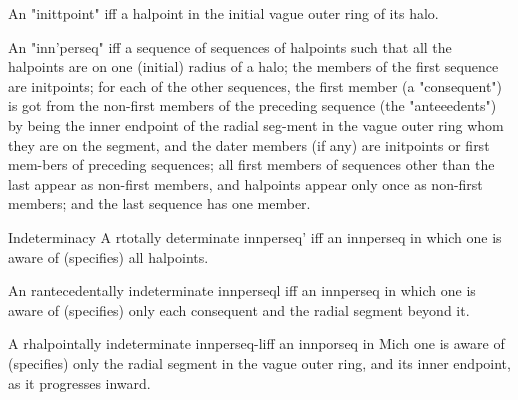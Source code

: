 An "inittpoint" iff a halpoint in the initial vague outer ring of its halo.

An "inn'perseq" iff a sequence of sequences of halpoints such that all the halpoints are on one (initial) radius of a halo; the members of the first sequence are initpoints; for each of the other sequences, the first member (a "consequent") is got from the non-first members of the preceding sequence (the "anteeedents") by being the inner endpoint of the radial seg-ment in the vague outer ring whom they are on the segment, and the dater members (if any) are initpoints or first mem-bers of preceding sequences; all first members of sequences other than the last appear as non-first members, and halpoints appear only once as non-first members; and the last sequence has one member. 

Indeterminacy A rtotally determinate innperseq' iff an innperseq in which one is aware of (specifies) all halpoints. 

An rantecedentally indeterminate innperseql iff an innperseq in which one is aware of (specifies) only each consequent and the radial segment beyond it. 

A rhalpointally indeterminate innperseq-liff an innporseq in Mich one is aware of (specifies) only the radial segment in the vague outer ring, and its inner endpoint, as it progresses inward. 


